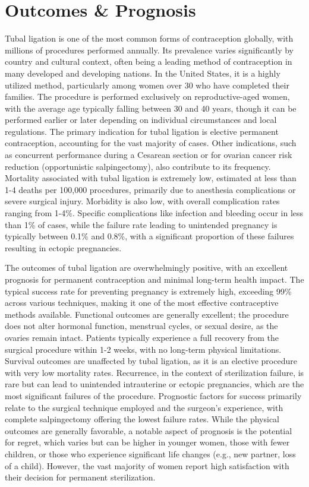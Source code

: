 \section*{Outcomes \& Prognosis}
Tubal ligation is one of the most common forms of contraception globally, with millions of procedures performed annually. Its prevalence varies significantly by country and cultural context, often being a leading method of contraception in many developed and developing nations. In the United States, it is a highly utilized method, particularly among women over 30 who have completed their families. The procedure is performed exclusively on reproductive-aged women, with the average age typically falling between 30 and 40 years, though it can be performed earlier or later depending on individual circumstances and local regulations. The primary indication for tubal ligation is elective permanent contraception, accounting for the vast majority of cases. Other indications, such as concurrent performance during a Cesarean section or for ovarian cancer risk reduction (opportunistic salpingectomy), also contribute to its frequency. Mortality associated with tubal ligation is extremely low, estimated at less than 1-4 deaths per 100,000 procedures, primarily due to anesthesia complications or severe surgical injury. Morbidity is also low, with overall complication rates ranging from 1-4\%. Specific complications like infection and bleeding occur in less than 1\% of cases, while the failure rate leading to unintended pregnancy is typically between 0.1\% and 0.8\%, with a significant proportion of these failures resulting in ectopic pregnancies.

The outcomes of tubal ligation are overwhelmingly positive, with an excellent prognosis for permanent contraception and minimal long-term health impact. The typical success rate for preventing pregnancy is extremely high, exceeding 99\% across various techniques, making it one of the most effective contraceptive methods available. Functional outcomes are generally excellent; the procedure does not alter hormonal function, menstrual cycles, or sexual desire, as the ovaries remain intact. Patients typically experience a full recovery from the surgical procedure within 1-2 weeks, with no long-term physical limitations. Survival outcomes are unaffected by tubal ligation, as it is an elective procedure with very low mortality rates. Recurrence, in the context of sterilization failure, is rare but can lead to unintended intrauterine or ectopic pregnancies, which are the most significant failures of the procedure. Prognostic factors for success primarily relate to the surgical technique employed and the surgeon's experience, with complete salpingectomy offering the lowest failure rates. While the physical outcomes are generally favorable, a notable aspect of prognosis is the potential for regret, which varies but can be higher in younger women, those with fewer children, or those who experience significant life changes (e.g., new partner, loss of a child). However, the vast majority of women report high satisfaction with their decision for permanent sterilization.

